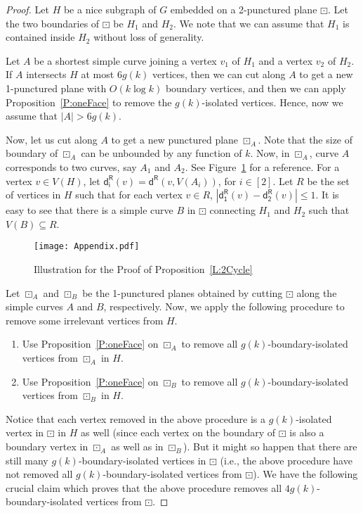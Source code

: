 \documentclass{article}
\numberwithin{claimcounter}{lemma}
\begin{document}
\begin{proof}
Let $H$ be a nice subgraph of $G$ embedded on a 2-punctured plane $\boxdot$. Let the two boundaries of $\boxdot$ be $H_1$ and $H_2$. We note that we can assume that $H_1$ is contained inside $H_2$ without loss of generality. 

Let $A$ be a shortest simple curve joining a vertex $v_1$ of $H_1$ and a vertex $v_2$ of $H_2$. If $A$ intersects $H$ at most $6g(k)$ vertices, then we can cut along $A$ to get a new 1-punctured plane with  $O(k \log k)$ boundary vertices, and then we can apply Proposition~\ref{P:oneFace} to remove the $g(k)$-isolated vertices. Hence, now we assume that $|A|>6g(k)$. 


Now, let us cut along $A$ to get a new punctured plane $\boxdot_A$. Note that the size of boundary of $\boxdot_A$ can be unbounded by any function of $k$. Now, in $\boxdot_A$, curve $A$ corresponds to two curves, say $A_1$ and $A_2$. See Figure~\ref{fig:2face1} for a reference. 
For a vertex $v\in V(H)$, let $\mathsf{d^R_i}(v) = \mathsf{d^R}(v,V(A_i))$, for $i\in [2]$. Let $R$ be the set of vertices in $H$ such that for each vertex $v\in R$, $|\mathsf{d^R_1}(v)-\mathsf{d^R_2}(v)| \leq 1$. It is easy to see that there is a simple curve $B$ in $\boxdot$ connecting $H_1$ and $H_2$ such that $V(B) \subseteq R$.

\begin{figure}
    \centering
    \texttt{[image: Appendix.pdf]}
    \caption{Illustration for the Proof of Proposition~\ref{L:2Cycle}}
    \label{fig:2face1}
\end{figure}
Let $\boxdot_A$ and $\boxdot_B$ be the 1-punctured planes obtained by cutting $\boxdot$ along the simple curves $A$ and $B$, respectively. Now, we apply the following procedure to remove some irrelevant vertices from $H$. 
\begin{enumerate}
    \item Use Proposition~\ref{P:oneFace} on $\boxdot_A$ to remove all $g(k)$-boundary-isolated vertices from $\boxdot_A$ in $H$. 
    \item Use Proposition~\ref{P:oneFace} on $\boxdot_B$ to remove all $g(k)$-boundary-isolated vertices from $\boxdot_B$ in $H$. 
\end{enumerate}

Notice that each vertex removed in the above procedure is a $g(k)$-isolated vertex in $\boxdot$ in $H$ as well (since each vertex on the boundary of $\boxdot$ is also a boundary vertex in $\boxdot_A$ as well as in $\boxdot_B$). But it might so happen that there are still many $g(k)$-boundary-isolated vertices in $\boxdot$ (i.e., the above procedure have not removed all $g(k)$-boundary-isolated vertices from $\boxdot$). We have the following crucial claim which proves that the above procedure removes all $4g(k)$-boundary-isolated vertices from $\boxdot$. 


\end{proof}
\end{document}
